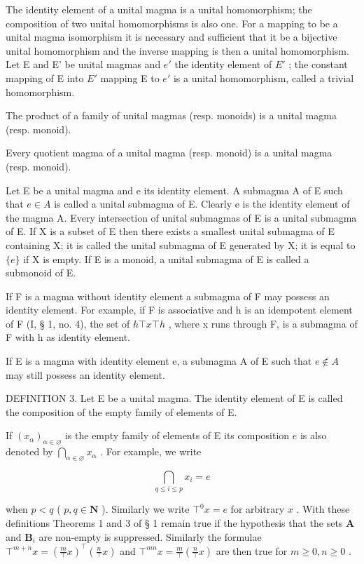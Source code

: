 The identity element of a unital magma is a unital homomorphism; the composition of two unital homomorphisms is also one. For a mapping to be a unital magma isomorphism it is necessary and sufficient that it be a bijective unital homomorphism and the inverse mapping is then a unital homomorphism. Let E and E' be unital magmas and \(e'\) the identity element of \(E'\) ; the constant mapping of E into \(E'\) mapping E to \(e'\) is a unital homomorphism, called a trivial homomorphism.

The product of a family of unital magmas (resp. monoids) is a unital magma (resp. monoid).

Every quotient magma of a unital magma (resp. monoid) is a unital magma (resp. monoid).

Let E be a unital magma and e its identity element. A submagma A of E such that \(e \in A\) is called a unital submagma of E. Clearly e is the identity element of the magma A. Every intersection of unital submagmas of E is a unital submagma of E. If X is a subset of E then there exists a smallest unital submagma of E containing X; it is called the unital submagma of E generated by X; it is equal to \(\{e\}\) if X is empty. If E is a monoid, a unital submagma of E is called a submonoid of E.

If F is a magma without identity element a submagma of F may possess an identity element. For example, if F is associative and h is an idempotent element of F (I, § 1, no. 4), the set of \(h \top x \top h\) , where x runs through F, is a submagma of F with h as identity element.

If E is a magma with identity element e, a submagma A of E such that \(e \notin A\) may still possess an identity element.

DEFINITION 3. Let E be a unital magma. The identity element of E is called the composition of the empty family of elements of E.

If \((x_{\alpha})_{\alpha \in \varnothing}\) is the empty family of elements of E its composition \(e\) is also denoted by \(\bigcap_{\alpha \in \varnothing} x_{\alpha}\) . For example, we write

\[
\bigcap_ {q \leqslant i \leqslant p} x _ {i} = e
\]

when \(p < q\) ( \(p, q \in \mathbf{N}\) ). Similarly we write \(\top^0 x = e\) for arbitrary \(x\) . With these definitions Theorems 1 and 3 of § 1 remain true if the hypothesis that the sets \(\mathbf{A}\) and \(\mathbf{B}_i\) are non-empty is suppressed. Similarly the formulae \(\top^{m+n} x = \left( \frac{m}{\top} x \right)^{\top} \left( \frac{n}{\top} x \right)\) and \(\top^{mn} x = \frac{m}{\top} \left( \frac{n}{\top} x \right)\) are then true for \(m \geqslant 0, n \geqslant 0\) .

